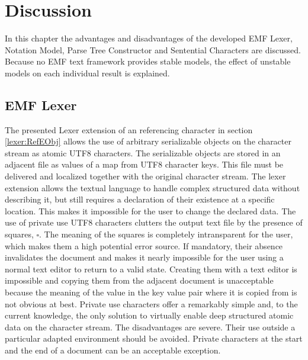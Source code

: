\chapter{Discussion} \label{cha:discussion}
In this chapter the advantages and disadvantages of the developed EMF Lexer, Notation Model, Parse Tree Constructor and Sentential Characters are discussed. Because no EMF text framework provides stable models, the effect of unstable models on each individual result is explained.  
%
\section{EMF Lexer} \label{sec:EMFLexer} The presented Lexer extension of an referencing character in section \ref{lexer:RefEObj} allows the use of arbitrary serializable objects on the character stream as atomic UTF8 characters. The serializable objects are stored in an adjacent file as values of a map from UTF8 character keys. This file must be delivered and localized together with the original character stream. The lexer extension allows the textual language to handle complex structured data without describing it, but still requires a declaration of their existence at a specific location. This makes it impossible for the user to change the declared data. The use of private use UTF8 characters clutters the output text file by the presence of squares, $\square$. The meaning of the squares is completely intransparent for the user, which makes them a high potential error source. If mandatory, their absence invalidates the document and makes it nearly impossible for the user using a normal text editor to return to a valid state. Creating them with a text editor is impossible and copying them from the adjacent document is unacceptable because the meaning of the value in the key value pair where it is copied from is not obvious at best. Private use characters offer a remarkably simple and, to the current knowledge, the only solution to virtually enable deep structured atomic data on the character stream. The disadvantages are severe. Their use outside a particular adapted environment should be avoided. Private characters at the start and the end of a document can be an acceptable exception. 

